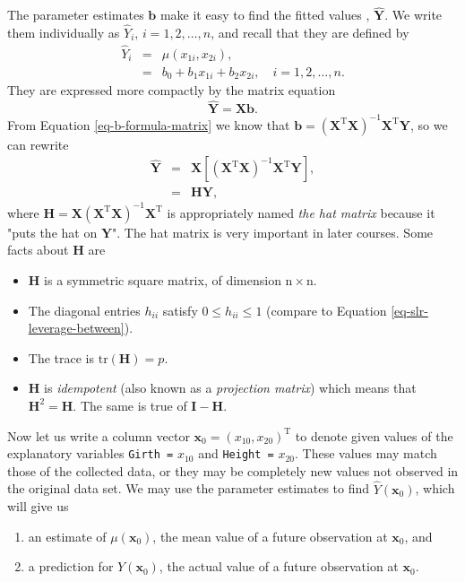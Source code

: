 The parameter estimates \(\mathbf{b}\) make it easy to find the fitted
values , \(\hat{\mathbf{Y}}\). We write them
individually as \(\hat{Y}_{i}\), \(i=1,2,\ldots,n\), and recall that
they are defined by
\begin{eqnarray}
\hat{Y}_{i} & = & \hat{\mu}(x_{1i},x_{2i}),\\
 & = & b_{0}+b_{1}x_{1i}+b_{2}x_{2i},\quad i=1,2,\ldots,n.
\end{eqnarray}
They are expressed more compactly by the matrix equation
\begin{equation}
\hat{\mathbf{Y}}=\mathbf{X}\mathbf{b}.
\end{equation}
From Equation \eqref{eq-b-formula-matrix} we know that
\(\mathbf{b}=\left(\mathbf{X}^{\mathrm{T}}\mathbf{X}\right)^{-1}\mathbf{X}^{\mathrm{T}}\mathbf{Y}\),
so we can rewrite
\begin{eqnarray}
\hat{\mathbf{Y}} & = & \mathbf{X}\left[\left(\mathbf{X}^{\mathrm{T}}\mathbf{X}\right)^{-1}\mathbf{X}^{\mathrm{T}}\mathbf{Y}\right],\\
 & = & \mathbf{H}\mathbf{Y},
\end{eqnarray}
where
\(\mathbf{H}=\mathbf{X}\left(\mathbf{X}^{\mathrm{T}}\mathbf{X}\right)^{-1}\mathbf{X}^{\mathrm{T}}\)
is appropriately named \emph{the hat matrix}  because it
"puts the hat on \(\mathbf{Y}\)". The hat matrix is very important in
later courses. Some facts about \(\mathbf{H}\) are
\begin{itemize}
\item \(\mathbf{H}\) is a symmetric square matrix, of dimension
\(\mathrm{n}\times\mathrm{n}\).
\item The diagonal entries \(h_{ii}\) satisfy \(0\leq h_{ii}\leq1\)
  (compare to Equation \eqref{eq-slr-leverage-between}).
\item The trace is \(\mathrm{tr}(\mathbf{H})=p\).
\item \(\mathbf{H}\) is \emph{idempotent} (also known as a \emph{projection matrix})
which means that \(\mathbf{H}^{2}=\mathbf{H}\). The same is true of
\(\mathbf{I}-\mathbf{H}\).
\end{itemize}


Now let us write a column vector
\(\mathbf{x}_{0}=(x_{10},x_{20})^{\mathrm{T}}\) to denote given values
of the explanatory variables \texttt{Girth =} \(x_{10}\) and \texttt{Height =}
\(x_{20}\). These values may match those of the collected data, or
they may be completely new values not observed in the original data
set. We may use the parameter estimates to find
\(\hat{Y}(\mathbf{x}_{0})\), which will give us
\begin{enumerate}
\item an estimate of \(\mu(\mathbf{x}_{0})\), the mean value of a future
observation at \(\mathbf{x}_{0}\), and
\item a prediction for \(Y(\mathbf{x}_{0})\), the actual value of a
future observation at \(\mathbf{x}_{0}\).
\end{enumerate}

